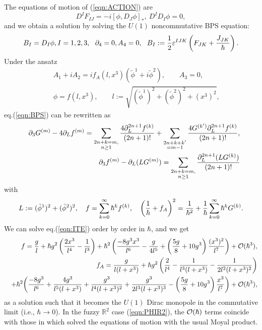 \documentclass[12pt,a4paper]{article}
\def\h{\hbar}
\begin{document}
The equations of motion of (\ref{eqn:ACTION}) are
\begin{equation}
D^IF_{IJ}=-i[\phi,D_J\phi]_*,\ D^ID_I\phi=0,
\end{equation}
and we obtain a solution by solving the $U(1)$ noncommutative BPS
equation:
\begin{equation}
\label{eqn:BPS}
B_I= D_I\phi,I=1,2,3,\ \ \partial_4=0,A_4=0,\ \
B_I:={1\over2}\varepsilon^{IJK}\left(F_{JK}+{J_{JK}\over\h}\right).
\end{equation}
Under the ansatz
\begin{eqnarray}
\label{eqn:ANSATZ}
&&A_1+iA_2=if_A(l,x^3)({\tilde \phi}^1+i{\tilde \phi}^2),\quad\quad
A_3=0,\nonumber\\
&&\phi=f(l,x^3),\quad\quad l:=\sqrt{({\tilde \phi}^1)^2+({\tilde
    \phi}^2)^2+(x^3)^2},
\end{eqnarray}
eq.(\ref{eqn:BPS}) can be rewritten as
\begin{eqnarray}
\label{eqn:ITE}
&&\partial_3G^{(m)}-4\partial_Lf^{(m)}
=\sum_{
\begin{subarray}{c}
2n+k=m,\\
n\geq1
\end{subarray}
}{4\partial_L^{2n+1}f^{(k)}\over(2n+1)!}+\sum_{
\begin{subarray}{c}
2n+k+k'\\
=m-1
\end{subarray}
}{4G^{(k')}\partial_L^{2n+1}f^{(k)}\over(2n+1)!},\nonumber\\
&&\partial_3f^{(m)}-\partial_L(LG^{(m)})=\sum_{
\begin{subarray}{c}
2n+k=m,\\
n\geq1
\end{subarray}
}{\partial_L^{2n+1}(LG^{(k)})\over(2n+1)!}
\end{eqnarray}
with
\begin{equation}
L:=({\tilde \phi}^1)^2+({\tilde \phi}^2)^2,\quad
f=\sum_{k=0}^\infty\h^k f^{(k)},\quad
\left({1\over\h}+f_A\right)^2={1\over\h^2}+{1\over\h}\sum_{k=0}^\infty\h^k G^{(k)}.
\end{equation}
We can solve eq.(\ref{eqn:ITE}) order by order in $\h$, and we get
\begin{eqnarray}
&&f={g\over l}+\h g^2\left({2x^3\over l^4}-{1\over
    l^3}\right)+\h^2\left({-8g^3x^3\over
    l^6}-{g\over4l^5}+\left({5g\over8}+10g^3\right){(x^3)^2\over
    l^7}\right)+{\cal O}(\h^3),\nonumber\\
&&f_A={g\over l(l+x^3)}+\h g^2\left({2\over l^4}-{1\over
    l^3(l+x^3)}-{1\over2l^2(l+x^3)^2}\right)\nonumber\\
&&+\h^2\biggl({-8g^3\over l^6}+{4g^3\over l^5(l+x^3)}+{g^3\over
    l^4(l+x^3)^2}+{g^3\over2l^3(l+x^3)^3}-\left({5g\over8}+10g^3\right){x^3\over l^7}\biggr)+{\cal O}(\h^3),\nonumber\\
\end{eqnarray}
as a solution such that it becomes the $U(1)$ Dirac monopole in
the commutative limit (i.e., $\h\rightarrow0$). In the fuzzy
 ${\mathbb R}^2$ 
  case (\ref{eqn:PHIR2}), the ${\cal O}(\h)$ terms coincide with those in
  \cite{HH} which solved the equations of motion with the usual Moyal product.
\end{document}

